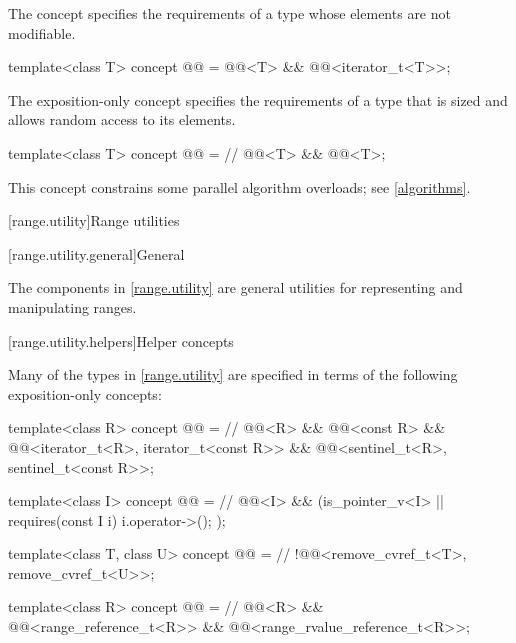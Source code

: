 \pnum
The  concept specifies the requirements of a
 type whose elements are not modifiable.

\begin{itemdecl}
template<class T>
  concept @@ =
    @@<T> && @@<iterator_t<T>>;
\end{itemdecl}

\pnum
The exposition-only concept 
specifies the requirements of a  type
that is sized and allows random access to its elements.

\begin{itemdecl}
template<class T>
  concept @@ =           // \expos
    @@<T> && @@<T>;
\end{itemdecl}
\begin{note}
This concept constrains some parallel algorithm overloads;
see \ref{algorithms}.
\end{note}

[range.utility]{Range utilities}

[range.utility.general]{General}

\pnum
The components in \ref{range.utility} are general utilities for representing and
manipulating ranges.

[range.utility.helpers]{Helper concepts}

\pnum
Many of the types in \ref{range.utility} are specified in terms of
the following exposition-only concepts:

\begin{codeblock}
template<class R>
  concept @@ =                                     // \expos
    @@<R> && @@<const R> &&
    @@<iterator_t<R>, iterator_t<const R>> &&
    @@<sentinel_t<R>, sentinel_t<const R>>;

template<class I>
  concept @@ =                                       // \expos
    @@<I> && (is_pointer_v<I> || requires(const I i) { i.operator->(); });

template<class T, class U>
  concept @@ =                                  // \expos
    !@@<remove_cvref_t<T>, remove_cvref_t<U>>;

template<class R>
  concept @@ =                   // \expos
    @@<R> && @@<range_reference_t<R>> &&
    @@<range_rvalue_reference_t<R>>;
\end{codeblock}

